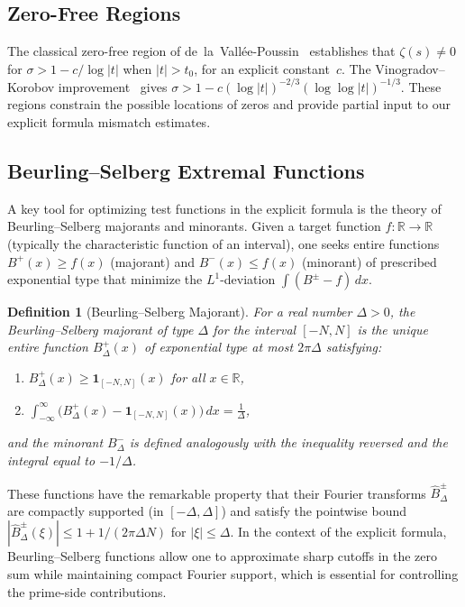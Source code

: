\documentclass[11pt]{article}
\newtheorem{definition}[theorem]{Definition}
\theoremstyle{remark}
\begin{document}
\subsection{Zero-Free Regions}

The classical zero-free region of de~la~Vall\'ee-Poussin~\cite{dlVP} establishes that
$\zeta(s)\neq 0$ for $\sigma>1-c/\log|t|$ when $|t|>t_0$, for an explicit constant~$c$.
The Vinogradov--Korobov improvement~\cite{IK} gives
$\sigma > 1 - c(\log|t|)^{-2/3}(\log\log|t|)^{-1/3}$.
These regions constrain the possible locations of zeros and provide partial input to
our explicit formula mismatch estimates.

\subsection{Beurling--Selberg Extremal Functions}
\label{subsec:beurling-selberg}

A key tool for optimizing test functions in the explicit formula is the theory
of Beurling--Selberg majorants and minorants.
Given a target function $f\colon\mathbb{R}\to\mathbb{R}$ (typically the
characteristic function of an interval), one seeks entire functions
$B^+(x)\geq f(x)$ (majorant) and $B^-(x)\leq f(x)$ (minorant) of prescribed
exponential type that minimize the $L^1$-deviation $\int(B^\pm - f)\,dx$.

\begin{definition}[Beurling--Selberg Majorant]
\label{def:beurling-selberg}
For a real number $\Delta>0$, the \emph{Beurling--Selberg majorant of type $\Delta$
for the interval $[-N,N]$} is the unique entire function $B^+_\Delta(x)$
of exponential type at most $2\pi\Delta$ satisfying:
\begin{enumerate}
  \item[(i)] $B^+_\Delta(x)\geq\mathbf{1}_{[-N,N]}(x)$ for all $x\in\mathbb{R}$,
  \item[(ii)] $\displaystyle\int_{-\infty}^{\infty}\bigl(B^+_\Delta(x)-\mathbf{1}_{[-N,N]}(x)\bigr)\,dx
    = \frac{1}{\Delta}$,
\end{enumerate}
and the minorant $B^-_\Delta$ is defined analogously with the inequality reversed
and the integral equal to $-1/\Delta$.
\end{definition}

These functions have the remarkable property that their Fourier transforms
$\hat{B}^\pm_\Delta$ are compactly supported (in $[-\Delta,\Delta]$) and
satisfy the pointwise bound $|\hat{B}^\pm_\Delta(\xi)|\leq 1+1/(2\pi\Delta N)$
for $|\xi|\leq\Delta$.
In the context of the explicit formula, Beurling--Selberg functions allow one
to approximate sharp cutoffs in the zero sum while maintaining compact Fourier
support, which is essential for controlling the prime-side contributions.
\end{document}

